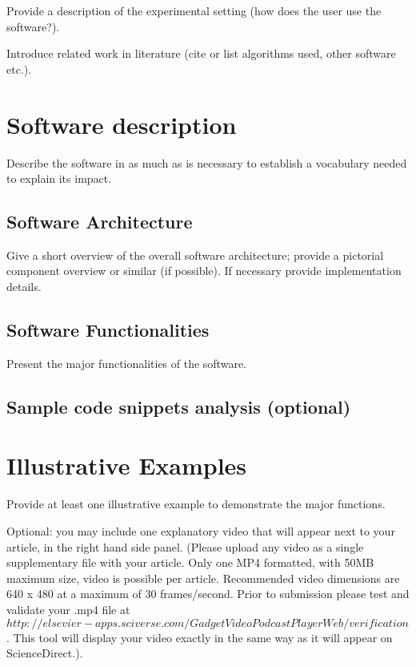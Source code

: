 \documentclass[preprint,12pt, a4paper]{elsarticle}
\begin{document}
Provide a description of the experimental setting (how does the user use the software?).

Introduce related work in literature (cite or list algorithms used, other software etc.).


\section{Software description}
\label{description}

Describe the software in as much as is necessary to establish a vocabulary needed to explain its impact. 

\subsection{Software Architecture}
\label{architecture}

Give a short overview of the overall software architecture; provide a pictorial component overview or similar (if possible). If necessary provide implementation details.

\subsection{Software Functionalities}
\label{functionalities}

Present the major functionalities of the software.

\subsection{Sample code snippets analysis (optional)}
\label{code}

\section{Illustrative Examples}
\label{examples}

Provide at least one illustrative example to demonstrate the major functions.

Optional: you may include one explanatory video that will appear next to your article, in the right hand side panel. (Please upload any video as a single supplementary file with your article. Only one MP4 formatted, with 50MB maximum size, video is possible per article. Recommended video dimensions are 640 x 480 at a maximum of 30 frames/second. Prior to submission please test and validate your .mp4 file at $ http://elsevier-apps.sciverse.com/GadgetVideoPodcastPlayerWeb/verification$. This tool will display your video exactly in the same way as it will appear on ScienceDirect.).
\end{document}

